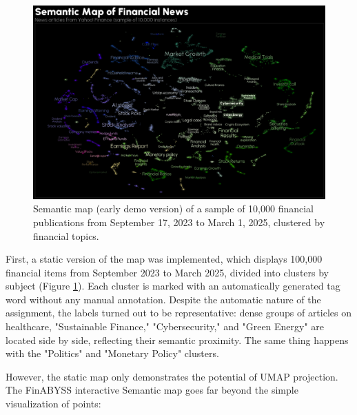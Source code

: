 \begin{figure}[H]
    \centering
    \includegraphics[width=1\linewidth]{img/semantic_map.png}
    \caption{Semantic map (early demo version) of a sample of 10,000 financial publications
    from September 17, 2023 to March 1, 2025, clustered by financial topics.}
    \label{fig:semantic_map}
\end{figure}

First, a static version of the map was implemented, which displays 100,000 financial items from September 2023
to March 2025, divided into clusters by subject (Figure \ref{fig:semantic_map}). Each cluster is marked
with an automatically generated tag word without any manual annotation. Despite the automatic nature
of the assignment, the labels turned out to be representative: dense groups of articles on healthcare,
"Sustainable Finance," "Cybersecurity," and "Green Energy" are located side by side, reflecting their semantic
proximity. The same thing happens with the "Politics" and "Monetary Policy" clusters.

However, the static map only demonstrates the potential of UMAP projection. The FinABYSS interactive Semantic
map goes far beyond the simple visualization of points:

